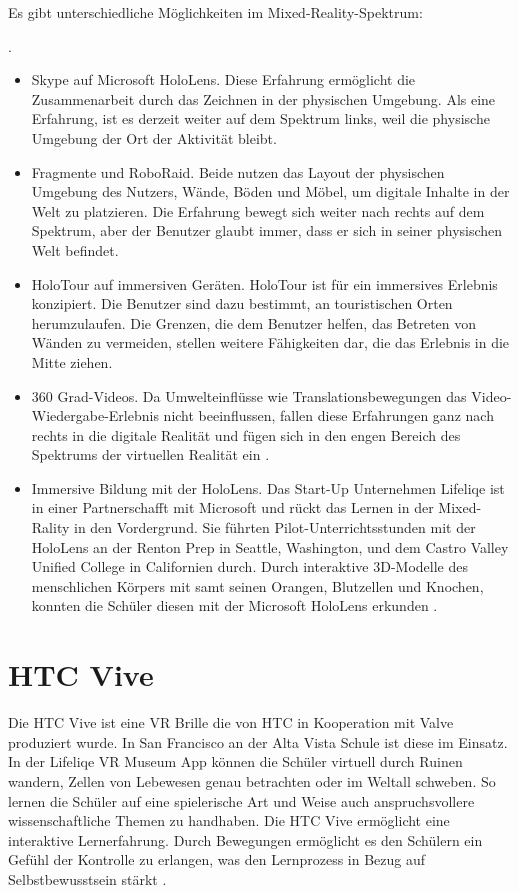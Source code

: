 	
Es gibt unterschiedliche Möglichkeiten im Mixed-Reality-Spektrum:
\begin{description}
	\item . 
	\begin{itemize}
		\item Skype auf Microsoft HoloLens. Diese Erfahrung ermöglicht die Zusammenarbeit durch das Zeichnen in der physischen Umgebung. Als eine Erfahrung, ist es derzeit weiter auf dem Spektrum links, weil die physische Umgebung der Ort der Aktivität bleibt.
		\item Fragmente und RoboRaid. Beide nutzen das Layout der physischen Umgebung des Nutzers, Wände, Böden und Möbel, um digitale Inhalte in der Welt zu platzieren. Die Erfahrung bewegt sich weiter nach rechts auf dem Spektrum, aber der Benutzer glaubt immer, dass er sich in seiner physischen Welt befindet.
		\item HoloTour auf immersiven Geräten. HoloTour ist für ein immersives Erlebnis konzipiert. Die Benutzer sind dazu bestimmt, an touristischen Orten herumzulaufen. Die Grenzen, die dem Benutzer helfen, das Betreten von Wänden zu vermeiden, stellen weitere Fähigkeiten dar, die das Erlebnis in die Mitte ziehen.
		\item 360 Grad-Videos. Da Umwelteinflüsse wie Translationsbewegungen das Video-Wiedergabe-Erlebnis nicht beeinflussen, fallen diese Erfahrungen ganz nach rechts in die digitale Realität und fügen sich in den engen Bereich des Spektrums der virtuellen Realität ein \cite[vgl.][]{BrandonBray}.
		\item  Immersive Bildung mit der HoloLens. Das Start-Up Unternehmen Lifeliqe ist in einer Partnerschafft mit Microsoft und rückt das Lernen in der Mixed-Rality in den Vordergrund. Sie führten Pilot-Unterrichtsstunden mit der HoloLens an der Renton Prep in Seattle, Washington, und dem Castro Valley Unified College in Californien durch. Durch interaktive 3D-Modelle des menschlichen Körpers mit samt seinen Orangen, Blutzellen und Knochen, konnten die Schüler diesen mit der Microsoft HoloLens erkunden \cite[vgl.][]{vrnerds.2017}. 
	\end{itemize}
\end{description}


\section{HTC Vive}
Die HTC Vive ist eine VR Brille die von HTC in Kooperation mit Valve produziert wurde. In San Francisco an der Alta Vista Schule ist diese im Einsatz. In der Lifeliqe VR Museum App können die Schüler virtuell durch Ruinen wandern, Zellen von Lebewesen genau betrachten oder im Weltall schweben. So lernen die Schüler auf eine spielerische Art und Weise auch anspruchsvollere wissenschaftliche Themen zu handhaben. Die HTC Vive ermöglicht eine interaktive Lernerfahrung. Durch Bewegungen ermöglicht es den Schülern ein Gefühl der Kontrolle zu erlangen, was den Lernprozess in Bezug auf Selbstbewusstsein stärkt  \cite[vgl.][]{vrnerds2.2017}.

